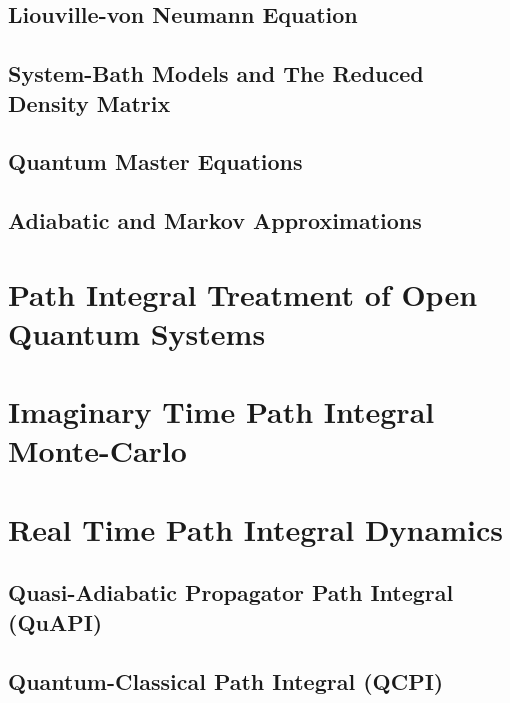 \subsection{Liouville-von Neumann Equation}

\subsection{System-Bath Models and The Reduced Density Matrix}

\subsection{Quantum Master Equations}

\subsection{Adiabatic and Markov Approximations}


\section{Path Integral Treatment of Open Quantum Systems}


\section{Imaginary Time Path Integral Monte-Carlo}




\section{Real Time Path Integral Dynamics}


\subsection{Quasi-Adiabatic Propagator Path Integral (QuAPI)}

\subsection{Quantum-Classical Path Integral (QCPI)}

